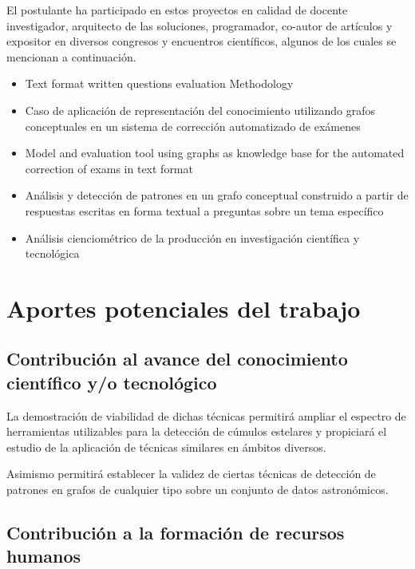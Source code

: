 \documentclass[
	11pt,oneside,a4paper,
	headsepline,footsepline,
	fleqn,
]{memoir}
\begin{document}
El postulante ha participado en estos proyectos en calidad de docente investigador, arquitecto de las soluciones, programador, co-autor de artículos y expositor en diversos congresos y encuentros científicos, algunos de los cuales se mencionan a continuación.

\begin{itemize}
	\item Text format written questions evaluation Methodology\cite{Menvielle2016}
	\item Caso de aplicación de representación del conocimiento utilizando grafos conceptuales en un sistema de corrección automatizado de exámenes\cite{PazMenvielle2017}
	\item Model and evaluation tool using graphs as knowledge base for the automated correction of exams in text format\cite{Menvielle2017}
	\item Análisis y detección de patrones en un grafo conceptual construido a partir de respuestas escritas en forma textual a preguntas sobre un tema específico\cite{PazMenvielle2018}
	\item Análisis cienciométrico de la producción en investigación científica y tecnológica\cite{Munoz2020}
\end{itemize}

\section{Aportes potenciales del trabajo}

\subsection{Contribución al avance del conocimiento científico y/o tecnológico}


La demostración de viabilidad de dichas técnicas permitirá ampliar el espectro de herramientas utilizables para la detección de cúmulos estelares y propiciará el estudio de la aplicación de técnicas similares en ámbitos diversos.

Asimismo permitirá establecer la validez de ciertas técnicas de detección de patrones en grafos de cualquier tipo sobre un conjunto de datos astronómicos.

\subsection{Contribución a la formación de recursos humanos}
\end{document}
